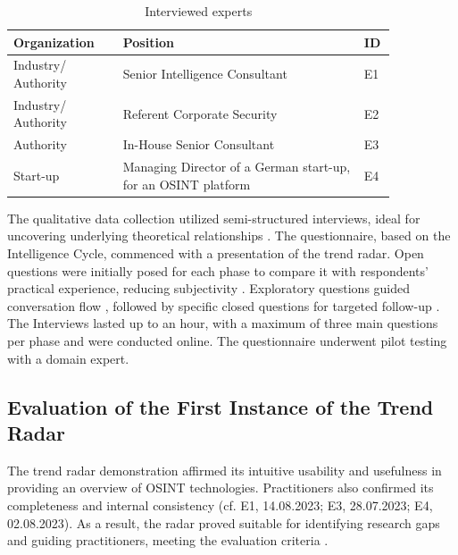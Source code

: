 \documentclass[10pt]{article}
\begin{document}
\begin{table}[htbp]
    \caption{Interviewed experts}
    \begin{tabular}{p{0.25\linewidth}p{0.55\linewidth}p{0.05\linewidth}}
        \toprule
        \textbf{Organization} & \textbf{Position}                                             & \textbf{ID} \\
        \hline
        Industry/ Authority   & Senior Intelligence Consultant                                & E1          \\
        \hline
        Industry/ Authority   & Referent Corporate Security                                   & E2          \\
        \hline
        Authority             & In-House Senior Consultant                                    & E3          \\
        \hline
        Start-up              & Managing Director of a German start-up, for an OSINT platform & E4          \\
        \bottomrule
    \end{tabular}
    \label{tab:experts}
\end{table}
The qualitative data collection utilized semi-structured interviews, ideal for uncovering underlying theoretical relationships \cite{Bogner.2014}. The questionnaire, based on the Intelligence Cycle, commenced with a presentation of the trend radar. Open questions were initially posed for each phase to compare it with respondents' practical experience, reducing subjectivity \cite{Saunders.2012}. Exploratory questions guided conversation flow \cite{Saunders.2012}, followed by specific closed questions for targeted follow-up \cite{Saunders.2012}. The Interviews lasted up to an hour, with a maximum of three main questions per phase \cite{Bogner.2014} and were conducted online. The questionnaire underwent pilot testing with a domain expert.

\subsection{Evaluation of the First Instance of the Trend Radar}

The trend radar demonstration affirmed its intuitive usability and usefulness in providing an overview of OSINT technologies. Practitioners also confirmed its completeness and internal consistency (cf. E1, 14.08.2023; E3, 28.07.2023; E4, 02.08.2023). As a result, the radar proved suitable for identifying research gaps and guiding practitioners, meeting the evaluation criteria \cite{Sonnenberg.2012}.
\end{document}

